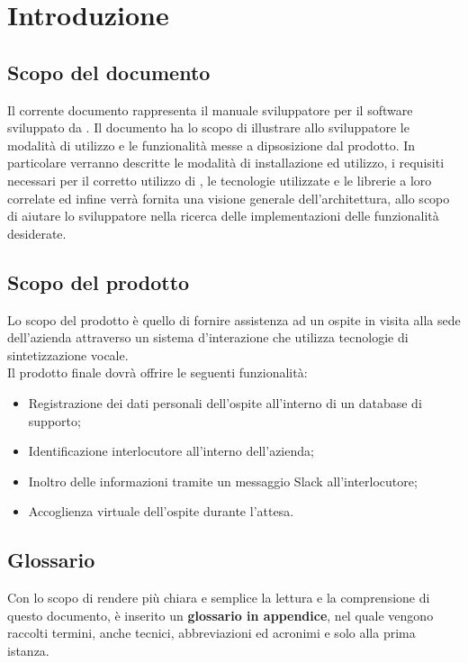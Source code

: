 \documentclass[../ManualeSviluppatore_v2.0.0.tex]{subfiles}
\begin{document}
\section{Introduzione}

	\subsection{Scopo del documento}
	Il corrente documento rappresenta il manuale sviluppatore per il software \atavi sviluppato da \kpanic. Il documento ha lo scopo di illustrare allo sviluppatore le modalità di utilizzo e le funzionalità messe a dipsosizione dal prodotto. In particolare verranno descritte le modalità di installazione ed utilizzo, i requisiti necessari per il corretto utilizzo di \atavi, le tecnologie utilizzate e le librerie a loro correlate ed infine verrà fornita una visione generale dell'architettura, allo scopo di aiutare lo sviluppatore nella ricerca delle implementazioni delle funzionalità desiderate.
	
	\subsection{Scopo del prodotto}
	Lo scopo del prodotto è quello di fornire assistenza ad un \gls{ospite} in visita alla sede dell'azienda attraverso un sistema d'interazione che utilizza \gls{tecnologie di sintetizzazione vocale}.
	\\Il prodotto finale dovrà offrire le seguenti funzionalità:
	\begin{itemize}
		\item Registrazione dei dati personali dell'ospite all'interno di un database di supporto;
		\item Identificazione \gls{interlocutore} all'interno dell'azienda;
		\item Inoltro delle informazioni tramite un messaggio \gls{Slack} all'interlocutore;
		\item Accoglienza virtuale dell'ospite durante l'attesa.
	\end{itemize}

	\subsection{Glossario}
	Con lo scopo di rendere più chiara e semplice la lettura e la comprensione di questo documento, è inserito un \textbf{glossario in appendice}, nel quale vengono raccolti termini, anche tecnici, abbreviazioni ed acronimi e solo alla prima istanza.
	
\end{document}
